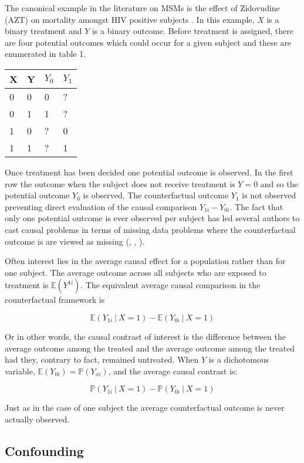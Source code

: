 \documentclass[11pt]{article}
\begin{document}
The canonical example in the literature on MSMs is the effect of
Zidovudine (AZT) on mortality amongst HIV positive subjects
\citet{Robins2000}. In this example, \(X\) is a binary treatment and
\(Y\) is a binary outcome. Before treatment is assigned, there are four
potential outcomes which could occur for a given subject and these are
enumerated in table 1.

\begin{longtable}[]{@{}llll@{}}
\toprule
X & Y & \(Y_{0}\) & \(Y_{1}\)\tabularnewline
\midrule
\endhead
0 & 0 & 0 & ?\tabularnewline
0 & 1 & 1 & ?\tabularnewline
1 & 0 & ? & 0\tabularnewline
1 & 1 & ? & 1\tabularnewline
\bottomrule
\end{longtable}

Once treatment has been decided one potential outcome is observed. In
the first row the outcome when the subject does not receive treatment is
\(Y = 0\) and so the potential outcome \(Y_{0}\) is observed. The
counterfactual outcome \(Y_{1}\) is not observed preventing direct
evaluation of the causal comparison \(Y_{1i} - Y_{0i}\). The fact that
only one potential outcome is ever observed per subject has led several
authors to cast causal problems in terms of missing data problems where
the counterfactual outcome is are viewed as missing (\citet{Ding2017},
\citet{Howe2015}, \citet{Edwards2015}). \linebreak

Often interest lies in the average causal effect for a population rather
than for one subject. The average outcome across all subjects who are
exposed to treatment is \(\mathbb{E}(Y^{1i})\). The equivalent average
causal comparison in the counterfactual framework is

\[\mathbb{E}(Y_{1i}\ |\ X = 1) - \mathbb{E}(Y_{0i}\ |\ X = 1)\]

Or in other words, the causal contrast of interest is the difference
between the average outcome among the treated and the average outcome
among the treated had they, contrary to fact, remained untreated. When
\(Y\) is a dichotomous variable,
\(\mathbb{E}(Y_{0i}) = \mathbb{P}(Y_{xi})\), and the average causal
contrast is:

\[\mathbb{P}(Y_{1i}\ |\ X = 1) - \mathbb{P}(Y_{0i}\ |\ X = 1)\]

Just as in the case of one subject the average counterfactual outcome is
never actually observed.

    \subsection{Confounding}\label{confounding}
\end{document}
